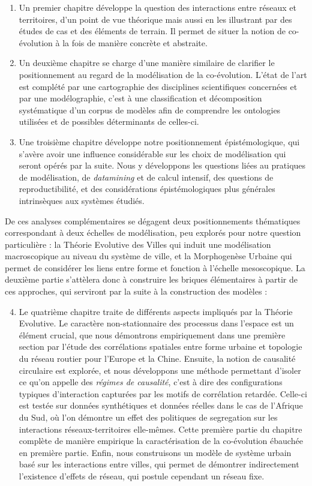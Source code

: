 {\begin{enumerate}
	\item Un premier chapitre développe la question des interactions entre réseaux et territoires, d'un point de vue théorique mais aussi en les illustrant par des études de cas et des éléments de terrain. Il permet de situer la notion de co-évolution à la fois de manière concrète et abstraite.
	\item Un deuxième chapitre se charge d'une manière similaire de clarifier le positionnement au regard de la modélisation de la co-évolution. L'état de l'art est complété par une cartographie des disciplines scientifiques concernées et par une modélographie, c'est à une classification et décomposition systématique d'un corpus de modèles afin de comprendre les ontologies utilisées et de possibles déterminants de celles-ci.
	\item Une troisième chapitre développe notre positionnement épistémologique, qui s'avère avoir une influence considérable sur les choix de modélisation qui seront opérés par la suite. Nous y développons les questions liées au pratiques de modélisation, de \emph{datamining} et de calcul intensif, des questions de reproductibilité, et des considérations épistémologiques plus générales intrinsèques aux systèmes étudiés. 
\end{enumerate}
De ces analyses complémentaires se dégagent deux positionnements thématiques correspondant à deux échelles de modélisation, peu explorés pour notre question particulière : la Théorie Evolutive des Villes qui induit une modélisation macroscopique au niveau du système de ville, et la Morphogenèse Urbaine qui permet de considérer les liens entre forme et fonction à l'échelle mesoscopique. La deuxième partie s'attèlera donc à construire les briques élémentaires à partir de ces approches, qui serviront par la suite à la construction des modèles :
\begin{enumerate}\setcounter{enumi}{3}
	\item Le quatrième chapitre traite de différents aspects impliqués par la Théorie Evolutive. Le caractère non-stationnaire des processus dans l'espace est un élément crucial, que nous démontrons empiriquement dans une première section par l'étude des corrélations spatiales entre forme urbaine et topologie du réseau routier pour l'Europe et la Chine. Ensuite, la notion de causalité circulaire est explorée, et nous développons une méthode permettant d'isoler ce qu'on appelle des \emph{régimes de causalité}, c'est à dire des configurations typiques d'interaction capturées par les motifs de corrélation retardée. Celle-ci est testée sur données synthétiques et données réelles dans le cas de l'Afrique du Sud, où l'on démontre un effet des politiques de segregation sur les interactions réseaux-territoires elle-mêmes. Cette première partie du chapitre complète de manière empirique la caractérisation de la co-évolution ébauchée en première partie. Enfin, nous construisons un modèle de système urbain basé sur les interactions entre villes, qui permet de démontrer indirectement l'existence d'effets de réseau, qui postule cependant un réseau fixe.

\end{enumerate}}
